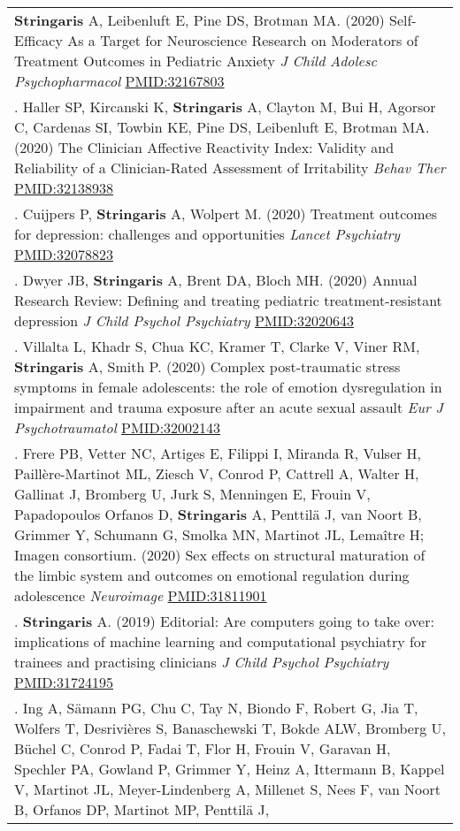 \documentclass[
]{article}
\begin{document}
\begin{longtable}[]{@{}
  >{\raggedright\arraybackslash}p{}@{}}
\textbf{Stringaris} A, Leibenluft E, Pine DS, Brotman MA. (2020)
Self-Efficacy As a Target for Neuroscience Research on Moderators of
Treatment Outcomes in Pediatric Anxiety \emph{J Child Adolesc
Psychopharmacol} \url{PMID:32167803} \\
74. Haller SP, Kircanski K, \textbf{Stringaris} A, Clayton M, Bui H,
Agorsor C, Cardenas SI, Towbin KE, Pine DS, Leibenluft E, Brotman MA.
(2020) The Clinician Affective Reactivity Index: Validity and
Reliability of a Clinician-Rated Assessment of Irritability \emph{Behav
Ther} \url{PMID:32138938} \\
75. Cuijpers P, \textbf{Stringaris} A, Wolpert M. (2020) Treatment
outcomes for depression: challenges and opportunities \emph{Lancet
Psychiatry} \url{PMID:32078823} \\
76. Dwyer JB, \textbf{Stringaris} A, Brent DA, Bloch MH. (2020) Annual
Research Review: Defining and treating pediatric treatment-resistant
depression \emph{J Child Psychol Psychiatry} \url{PMID:32020643} \\
77. Villalta L, Khadr S, Chua KC, Kramer T, Clarke V, Viner RM,
\textbf{Stringaris} A, Smith P. (2020) Complex post-traumatic stress
symptoms in female adolescents: the role of emotion dysregulation in
impairment and trauma exposure after an acute sexual assault \emph{Eur J
Psychotraumatol} \url{PMID:32002143} \\
78. Frere PB, Vetter NC, Artiges E, Filippi I, Miranda R, Vulser H,
Paillère-Martinot ML, Ziesch V, Conrod P, Cattrell A, Walter H, Gallinat
J, Bromberg U, Jurk S, Menningen E, Frouin V, Papadopoulos Orfanos D,
\textbf{Stringaris} A, Penttilä J, van Noort B, Grimmer Y, Schumann G,
Smolka MN, Martinot JL, Lemaître H; Imagen consortium. (2020) Sex
effects on structural maturation of the limbic system and outcomes on
emotional regulation during adolescence \emph{Neuroimage}
\url{PMID:31811901} \\
79. \textbf{Stringaris} A. (2019) Editorial: Are computers going to take
over: implications of machine learning and computational psychiatry for
trainees and practising clinicians \emph{J Child Psychol Psychiatry}
\url{PMID:31724195} \\
80. Ing A, Sämann PG, Chu C, Tay N, Biondo F, Robert G, Jia T, Wolfers
T, Desrivières S, Banaschewski T, Bokde ALW, Bromberg U, Büchel C,
Conrod P, Fadai T, Flor H, Frouin V, Garavan H, Spechler PA, Gowland P,
Grimmer Y, Heinz A, Ittermann B, Kappel V, Martinot JL, Meyer-Lindenberg
A, Millenet S, Nees F, van Noort B, Orfanos DP, Martinot MP, Penttilä J,

\end{longtable}
\end{document}
